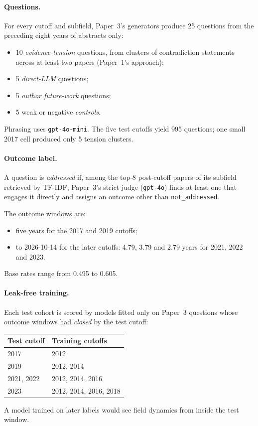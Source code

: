 \documentclass[11pt]{article}
\begin{document}
\paragraph{Questions.} For every cutoff and subfield, Paper~3's generators
produce 25 questions from the preceding eight years of abstracts only:
\begin{itemize}
\item 10 \emph{evidence-tension} questions, from clusters of contradiction
  statements across at least two papers (Paper~1's approach);
\item 5 \emph{direct-LLM} questions;
\item 5 \emph{author future-work} questions;
\item 5 weak or negative \emph{controls}.
\end{itemize}
Phrasing uses \texttt{gpt-4o-mini}. The five test cutoffs yield 995 questions;
one small 2017 cell produced only 5 tension clusters.

\paragraph{Outcome label.} A question is \emph{addressed} if, among the top-8
post-cutoff papers of its subfield retrieved by TF-IDF, Paper~3's strict judge
(\texttt{gpt-4o}) finds at least one that engages it directly and assigns an
outcome other than \texttt{not\_addressed}.

The outcome windows are:
\begin{itemize}
\item five years for the 2017 and 2019 cutoffs;
\item to 2026-10-14 for the later cutoffs: 4.79, 3.79 and 2.79 years for 2021,
  2022 and 2023.
\end{itemize}
Base rates range from 0.495 to 0.605.

\paragraph{Leak-free training.} Each test cohort is scored by models fitted
only on Paper~3 questions whose outcome windows had \emph{closed} by the test
cutoff:
\begin{center}
\begin{tabular}{@{}ll@{}}
\toprule
Test cutoff & Training cutoffs \\
\midrule
2017 & 2012 \\
2019 & 2012, 2014 \\
2021, 2022 & 2012, 2014, 2016 \\
2023 & 2012, 2014, 2016, 2018 \\
\bottomrule
\end{tabular}
\end{center}
A model trained on later labels would see field dynamics from inside the test
window.
\end{document}
